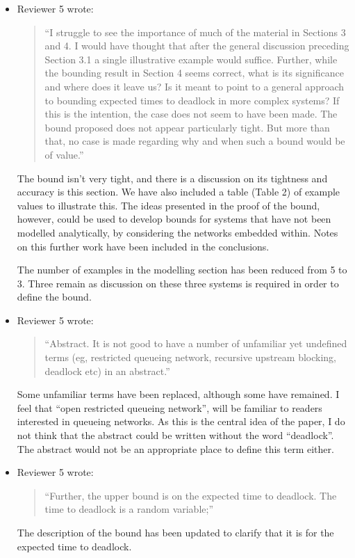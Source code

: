 \documentclass{article}
\begin{document}
\begin{itemize}
\item Reviewer 5 wrote:
\begin{quote}
``I struggle to see the importance of much of the material in Sections 3 and 4.
I would have thought that after the general discussion preceding Section 3.1
a single illustrative example would suffice.
Further, while the bounding result in Section 4 seems correct, what is its
significance and where does it leave us?
Is it meant to point to a general approach to bounding expected times to
deadlock in more complex systems?
If this is the intention, the case does not seem to have been made.
The bound proposed does not appear particularly tight.
But more than that, no case is made regarding why and when such a bound
would be of value.''
\end{quote}
The bound isn't very tight, and there is a discussion on its tightness and
accuracy is this section.
We have also included a table (Table 2) of example values to illustrate this.
The ideas presented in the proof of the bound, however, could be used to
develop bounds for systems that have not been modelled analytically, by
considering the networks embedded within.
Notes on this further work have been included in the conclusions.

The number of examples in the modelling section has been reduced from 5 to 3.
Three remain as discussion on these three systems is required in order to
define the bound.

\item Reviewer 5 wrote:
\begin{quote}
``Abstract. It is not good to have a number of unfamiliar yet undefined terms
(eg, restricted queueing network, recursive upstream blocking, deadlock etc)
in an abstract.''
\end{quote}
Some unfamiliar terms have been replaced, although some have remained.
I feel that ``open restricted queueing network'', will be
familiar to readers interested in queueing networks.
As this is the central idea of the paper, I do not think that the abstract
could be written without the word ``deadlock''.
The abstract would not be an appropriate place to define this term either.

\item Reviewer 5 wrote:
\begin{quote}
``Further, the upper bound is on the expected time to deadlock.
The time to deadlock is a random variable;''
\end{quote}
The description of the bound has been updated to clarify that it is for the
expected time to deadlock.


\end{itemize}
\end{document}
